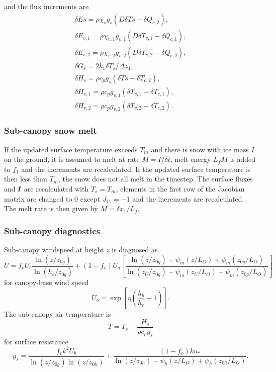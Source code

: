 \documentclass[fleqn]{article}
\begin{document}
and the flux increments are
\begin{gather}
\delta Es = \rho \chi_s g_s(D\delta Ts - \delta Q_{c,2}), \nonumber \\
\delta E_{v,1} = \rho \chi_{v,1} g_{v,1} (D\delta T_{v,1} - \delta Q_{c,1}), \nonumber \\
\delta E_{v,2} = \rho \chi_{v,2} g_{v,2} (D\delta T_{v,2} - \delta Q_{c,2}), \nonumber \\
\delta G_s = 2 k_1 \delta T_s/\Delta z_1, \nonumber \\
\delta H_s = \rho c_p g_s(\delta Ts - \delta T_{c,2}), \nonumber \\
\delta H_{v,1} = \rho c_p g_{v,1}(\delta T_{v,1} - \delta T_{c,1}), \nonumber \\
\delta H_{v,2} = \rho c_p g_{v,2}(\delta T_{v,2} - \delta T_{c,2}).
\end{gather}  

\subsubsection{Sub-canopy snow melt}
If the updated surface temperature exceeds $T_m$ and there is snow with ice mass $I$ on the ground, it is assumed to melt at rate $M=I/\delta t$, melt energy $L_f M$ is added to $f_1$ and the increments are recalculated. If the updated surface temperature is then less than $T_m$, the snow does not all melt in the timestep. The surface fluxes and ${\bf f}$ are recalculated with $T_s = T_m$, elements in the first row of the Jacobian matrix are changed to 0 except $J_{11}=-1$ and the increments are recalculated. The melt rate is then given by $M = \delta x_1/L_f$.


\subsubsection{Sub-canopy diagnostics}
Sub-canopy windspeed at height $z$ is diagnosed as
\begin{equation}
U = f_vU_b\frac{\ln(z/z_{0g})}{\ln(h_b/z_{0g})} + 
    (1-f_v)U_a\left[\frac{\ln(z/z_{0g}) - \psi_m(z/L_O) + \psi_m(z_{0g}/L_O)}
                         {\ln(z_U/z_{0g}) - \psi_m(z_U/L_O) + \psi_m(z_{0g}/L_O)}\right]
\end{equation}
for canopy-base wind speed
\begin{equation}
U_b = \exp\left[\eta\left(\frac{h_b}{h_c}-1\right)\right].
\end{equation}
The sub-canopy air temperature is
\begin{equation}
T = T_s - \frac{H_s}{\rho c_p g_s}
\end{equation}
for surface resistance
\begin{equation}
g_s = \frac{f_vk^2U_b}{\ln(z/z_{0g})\ln(z/z_{0h})} +
      \frac{(1-f_v)ku_*}{\ln(z/z_{0h}) - \psi_h(z/L_O) + \psi_h(z_{0h}/L_O)}.
\end{equation}
\end{document}
